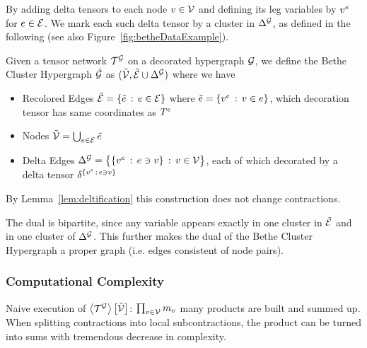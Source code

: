 By adding delta tensors to each node $v\in\mathcal{V}$ and defining its leg variables by $v^{e}$ for $e\in\mathcal{E}$.
We mark each such delta tensor by a cluster in $\Delta^{\mathcal{G}}$, as defined in the following (see also Figure~\ref{fig:betheDataExample}).

\begin{definition}
	Given a tensor network $\mathcal{T}^{\mathcal{G}}$ on a decorated hypergraph $\mathcal{G}$, we define the Bethe Cluster Hypergraph $\tilde{\mathcal{G}}$ as
	$(\tilde{\mathcal{V}}, \tilde{\mathcal{E}} \cup \Delta^{\mathcal{G}})$ where we have
	\begin{itemize}
		\item Recolored Edges $\tilde{\mathcal{E}} = \{\tilde{e} \, : \, e\in \mathcal{E}\}$ where $\tilde{e} = \{v^{e} \, : \, v\in e\}$, which decoration tensor has same coordinates as $T^{e}$
		\item Nodes $\tilde{\mathcal{V}} = \bigcup_{e\in\mathcal{E}}\tilde{e}$ %
		\item Delta Edges $\Delta^{\mathcal{G}} =  \big\{ \{v^{e} \, : \, e\ni v \} \, : \, v\in\mathcal{V} \big\} $, each of which decorated by a delta tensor $\delta^{\{v^{e} \, : \, e\ni v \}}$
	\end{itemize}
\end{definition}

By Lemma~\ref{lem:deltification} this construction does not change contractions.

The dual is bipartite, since any variable appears exactly in one cluster in $\tilde{\mathcal{E}}$ and in one cluster of $\Delta^{\mathcal{G}}$.
This further makes the dual of the Bethe Cluster Hypergraph a proper graph (i.e. edges consistent of node pairs). 





\subsubsection{Computational Complexity}


Naive execution of $\left\langle \mathcal{T}^{\mathcal{G}}\right\rangle \left[ \tilde{\mathcal{V}} \right]$: $\prod_{v\in\mathcal{V}} m_{v}$ many products are built and summed up.
When splitting contractions into local subcontractions, the product can be turned into sums with tremendous decrease in complexity.









